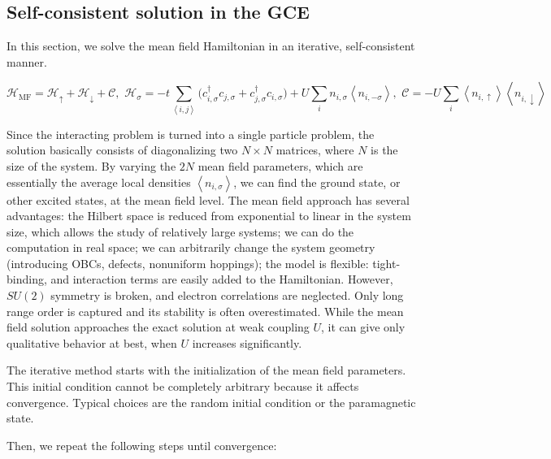 \subsection{Self-consistent solution in the \ac{GCE}}\label{subsec:selfconsistent}

In this section, we solve the mean field Hamiltonian in an iterative, self-consistent manner.

\begin{equation}
\mathcal{H}_{\text{MF}} = \mathcal{H}_\uparrow + \mathcal{H}_\downarrow + \mathcal{C} , \,\, \mathcal{H}_\sigma = - t \sum_{\left\langle i, j \right\rangle} \bigg( c_{i,\sigma}^\dagger c_{j,\sigma} + c_{j,\sigma}^\dagger c_{i,\sigma} \bigg) + U \sum_i n_{i,\sigma} \left\langle n_{i,-\sigma} \right\rangle , \,\, \mathcal{C} = - U \sum_i \left\langle n_{i,\uparrow} \right\rangle \left\langle n_{i,\downarrow} \right\rangle
\end{equation}

Since the interacting problem is turned into a single particle problem, the solution basically consists of diagonalizing two $N \times N$ matrices, where $N$ is the size of the system.
By varying the $2N$ mean field parameters, which are essentially the average local densities $\left\langle n_{i,\sigma} \right\rangle$, we can find the ground state, or other excited states, at the mean field level.
The mean field approach has several advantages: the Hilbert space is reduced from exponential to linear in the system size, which allows the study of relatively large systems; we can do the computation in real space; we can arbitrarily change the system geometry (introducing \acp{OBC}, defects, nonuniform hoppings); the model is flexible: tight-binding, and interaction terms are easily added to the Hamiltonian.
However, $SU(2)$ symmetry is broken, and electron correlations are neglected.
Only long range order is captured and its stability is often overestimated.
While the mean field solution approaches the exact solution at weak coupling $U$, it can give only qualitative behavior at best, when $U$ increases significantly.

The iterative method starts with the initialization of the mean field parameters.
This initial condition cannot be completely arbitrary because it affects convergence.
Typical choices are the random initial condition or the paramagnetic state.

Then, we repeat the following steps until convergence:

